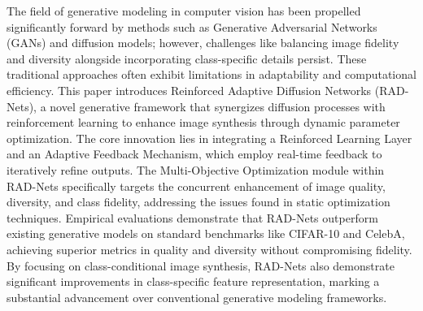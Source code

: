 

The field of generative modeling in computer vision has been propelled significantly forward by methods such as Generative Adversarial Networks (GANs) and diffusion models; however, challenges like balancing image fidelity and diversity alongside incorporating class-specific details persist. These traditional approaches often exhibit limitations in adaptability and computational efficiency. This paper introduces Reinforced Adaptive Diffusion Networks (RAD-Nets), a novel generative framework that synergizes diffusion processes with reinforcement learning to enhance image synthesis through dynamic parameter optimization. The core innovation lies in integrating a Reinforced Learning Layer and an Adaptive Feedback Mechanism, which employ real-time feedback to iteratively refine outputs. The Multi-Objective Optimization module within RAD-Nets specifically targets the concurrent enhancement of image quality, diversity, and class fidelity, addressing the issues found in static optimization techniques. Empirical evaluations demonstrate that RAD-Nets outperform existing generative models on standard benchmarks like CIFAR-10 and CelebA, achieving superior metrics in quality and diversity without compromising fidelity. By focusing on class-conditional image synthesis, RAD-Nets also demonstrate significant improvements in class-specific feature representation, marking a substantial advancement over conventional generative modeling frameworks.
